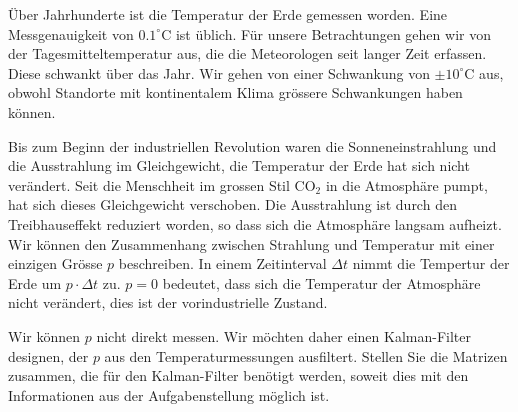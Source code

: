 Über Jahrhunderte ist die Temperatur der Erde gemessen worden.
Eine Messgenauigkeit von $0.1^\circ \text{C}$ ist üblich.
Für unsere Betrachtungen gehen wir von der Tagesmitteltemperatur aus,
die die Meteorologen seit langer Zeit erfassen.
Diese schwankt über das Jahr.
Wir gehen von einer Schwankung von $\pm 10^\circ\text{C}$ aus,
obwohl Standorte mit kontinentalem Klima grössere
Schwankungen haben können.

Bis zum Beginn der industriellen Revolution waren die Sonneneinstrahlung
und die Ausstrahlung im Gleichgewicht, die Temperatur der Erde hat sich
nicht verändert.
Seit die Menschheit im grossen Stil $\text{CO}_2$ in die Atmosphäre
pumpt, hat sich dieses Gleichgewicht verschoben.
Die Ausstrahlung ist durch den Treibhauseffekt reduziert worden,
so dass sich die Atmosphäre langsam aufheizt.
Wir können den Zusammenhang zwischen Strahlung und Temperatur mit einer
einzigen Grösse $p$ beschreiben.
In einem Zeitinterval $\Delta t$ nimmt die Tempertur der Erde um
$p\cdot\Delta t$ zu.
$p=0$ bedeutet, dass sich die Temperatur der Atmosphäre nicht verändert,
dies ist der vorindustrielle Zustand.

Wir können $p$ nicht direkt messen.
Wir möchten daher einen Kalman-Filter designen, der $p$ aus den
Temperaturmessungen ausfiltert.
Stellen Sie die Matrizen zusammen, die für den Kalman-Filter benötigt werden,
soweit dies mit den Informationen aus der Aufgabenstellung möglich ist.



